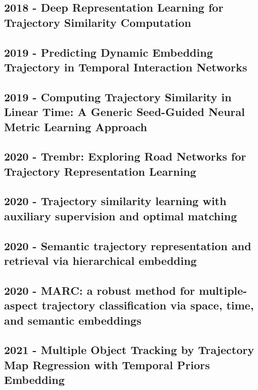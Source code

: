 \subsection*{2018 - Deep Representation Learning for Trajectory Similarity Computation}
\cite{li2018deep}

\subsection*{2019 - Predicting Dynamic Embedding Trajectory in Temporal Interaction Networks}
\cite{kumar2019predicting}

\subsection*{2019 - Computing Trajectory Similarity in Linear Time: A Generic Seed-Guided Neural Metric Learning Approach}
\cite{yao2019computing}

\subsection*{2020 - Trembr: Exploring Road Networks for Trajectory Representation Learning}

\cite{fu2020trembr}

\subsection*{2020 - Trajectory similarity learning with auxiliary supervision and optimal matching}

\cite{zhang2020trajectory}

\subsection*{2020 - Semantic trajectory representation and retrieval via hierarchical embedding}
\cite{gao2020semantic}

\subsection*{2020 - MARC: a robust method for multiple-aspect trajectory classification via space, time, and semantic embeddings}
\cite{may2020marc}

\subsection*{2021 - Multiple Object Tracking by Trajectory Map Regression with Temporal Priors Embedding}
\cite{wan2021multiple}

